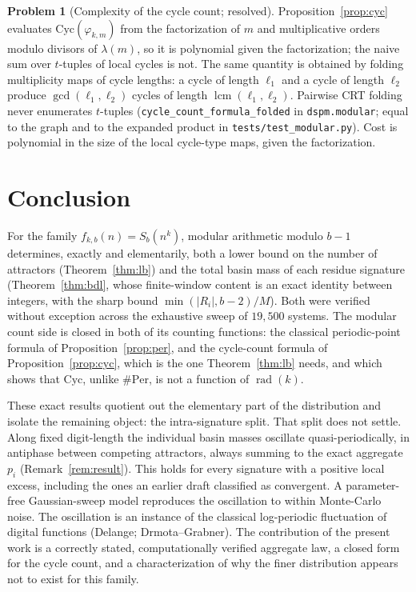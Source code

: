 \documentclass[11pt]{article}
\theoremstyle{definition}
\newtheorem{problem}[theorem]{Problem}
\theoremstyle{remark}
\newcommand{\Cyc}{\mathrm{Cyc}}
\newcommand{\Per}{\mathrm{Per}}
\DeclareMathOperator{\rad}{rad}
\DeclareMathOperator{\lcmop}{lcm}
\begin{document}
\begin{problem}[Complexity of the cycle count; resolved]
Proposition~\ref{prop:cyc} evaluates $\Cyc(\varphi_{k,m})$ from the factorization of $m$ and multiplicative orders modulo divisors of $\lambda(m)$, so it is polynomial given the factorization; the naive sum over $t$-tuples of local cycles is not. The same quantity is obtained by folding multiplicity maps of cycle lengths: a cycle of length $\ell_1$ and a cycle of length $\ell_2$ produce $\gcd(\ell_1,\ell_2)$ cycles of length $\lcmop(\ell_1,\ell_2)$. Pairwise CRT folding never enumerates $t$-tuples (\texttt{cycle\_count\_formula\_folded} in \texttt{dspm.modular}; equal to the graph and to the expanded product in \texttt{tests/test\_modular.py}). Cost is polynomial in the size of the local cycle-type maps, given the factorization.
\end{problem}

\section{Conclusion}

For the family $f_{k,b}(n) = S_b(n^k)$, modular arithmetic modulo $b-1$ determines, exactly and elementarily, both a lower bound on the number of attractors (Theorem~\ref{thm:lb}) and the total basin mass of each residue signature (Theorem~\ref{thm:bdl}, whose finite-window content is an exact identity between integers, with the sharp bound $\min(|R_i|,b-2)/M$). Both were verified without exception across the exhaustive sweep of $19{,}500$ systems. The modular count side is closed in both of its counting functions: the classical periodic-point formula of Proposition~\ref{prop:per}, and the cycle-count formula of Proposition~\ref{prop:cyc}, which is the one Theorem~\ref{thm:lb} needs, and which shows that $\Cyc$, unlike $\#\Per$, is not a function of $\rad(k)$.

These exact results quotient out the elementary part of the distribution and isolate the remaining object: the intra-signature split. That split does not settle. Along fixed digit-length the individual basin masses oscillate quasi-periodically, in antiphase between competing attractors, always summing to the exact aggregate $p_i$ (Remark~\ref{rem:result}). This holds for every signature with a positive local excess, including the ones an earlier draft classified as convergent. A parameter-free Gaussian-sweep model reproduces the oscillation to within Monte-Carlo noise. The oscillation is an instance of the classical log-periodic fluctuation of digital functions (Delange; Drmota--Grabner). The contribution of the present work is a correctly stated, computationally verified aggregate law, a closed form for the cycle count, and a characterization of why the finer distribution appears not to exist for this family.
\end{document}
